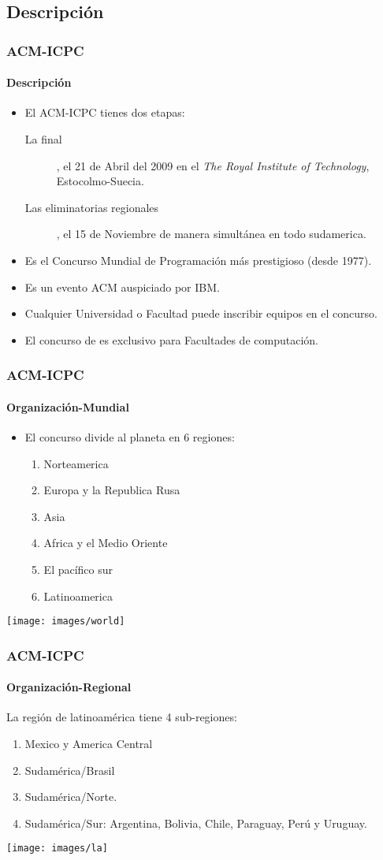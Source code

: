 \documentclass{beamer}
\begin{document}
\subsection{Descripción}
\begin{frame}
  \frametitle{ACM-ICPC}
  \framesubtitle{Descripción}
 \begin{itemize}
   \item El ACM-ICPC tienes dos etapas:
     \begin{description}
       \item[La final], el 21 de Abril del 2009 en el \emph{The Royal Institute of Technology}, Estocolmo-Suecia.
       \item[Las eliminatorias regionales], el 15 de Noviembre de manera simultánea en todo sudamerica.
     \end{description}
   \item Es el Concurso Mundial de Programación más prestigioso (desde 1977).
   \item Es un evento ACM auspiciado por IBM.
   \item Cualquier Universidad o Facultad puede inscribir equipos en el concurso.
   \item El concurso de es exclusivo para Facultades de computación.
 \end{itemize}
\end{frame}

\begin{frame}
 \frametitle{ACM-ICPC}
 \framesubtitle{Organización-Mundial}
 \begin{itemize}
  \item El concurso divide al planeta en 6 regiones:
  \begin{enumerate}
   \item Norteamerica
   \item Europa y la Republica Rusa
   \item Asia
   \item Africa y el Medio Oriente
   \item El pacífico sur
   \item Latinoamerica
  \end{enumerate}
 \end{itemize}
 \begin{center}
  \texttt{[image: images/world]}
 \end{center}
\end{frame}

\begin{frame}
 \frametitle{ACM-ICPC}
 \framesubtitle{Organización-Regional}
 La región de latinoamérica tiene 4 sub-regiones:
 \begin{enumerate}
  \item Mexico y America Central
  \item Sudamérica/Brasil
  \item Sudamérica/Norte.
  \item Sudamérica/Sur: Argentina, Bolivia, Chile, Paraguay, Perú y Uruguay. 
 \end{enumerate}
 \begin{center}
  \texttt{[image: images/la]}
 \end{center}
\end{frame}
\end{document}
